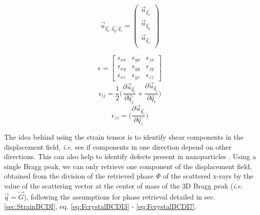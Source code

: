\begin{equation}
    \vec{u}_{\hat{q_x}, \hat{q_y}, \hat{q_z}} =
     \begin{pmatrix}
        \vec{u}_{\hat{q_x}} \\
        \vec{u}_{\hat{q_y}} \\
        \vec{u}_{\hat{q_z}} \\
     \end{pmatrix}
     \label{eq:DisplacementField}
\end{equation}

\begin{multicols}{3}
    \begin{equation}
        \epsilon =
        \begin{bmatrix}
            \epsilon_{xx} & \epsilon_{yx} & \epsilon_{zx}\\
            \epsilon_{xy} & \epsilon_{yy} & \epsilon_{zy}\\
            \epsilon_{xz} & \epsilon_{yz} & \epsilon_{zz}
        \end{bmatrix}
        \label{eq:StrainTensor}
    \end{equation}
    \break
    \begin{equation}
      \epsilon_{ij} = \frac{1}{2}
        \Bigg(
        \frac{\partial \vec{u}_{\hat{q_i}}}{\partial \hat{q_j}}
        +
        \frac{\partial \vec{u}_{\hat{q_j}}}{\partial \hat{q_i}}
        \Bigg)
        \label{eq:StrainTensorIJ}
    \end{equation}
    \break
    \begin{equation}
      \epsilon_{zz} =
        \Bigg(
        \frac{\partial \vec{u}_{\hat{q_z}}}{\partial \hat{q_z}}
        \Bigg)
        \label{eq:StrainTensorzz}
    \end{equation}
\end{multicols}

The idea behind using the strain tensor is to identify shear components in the displacement field, \textit{i.e.} see if components in one direction depend on other directions.
This can also help to identify defects present in nanoparticles \parencite{Lauraux2021}.
Using a single Bragg peak, we can only retrieve one component of the displacement field, obtained from the division of the retrieved phase $\Phi$ of the scattered x-rays by the value of the scattering vector at the center of mass of the 3D Bragg peak (\textit{i.e.} $\vec{q} = \vec{G}$), following the assumptions for phase retrieval detailed in sec. \ref{sec:StrainBCDI}, eq. \ref{eq:FcrystalBCDI3} - \ref{eq:FcrystalBCDI7}.

